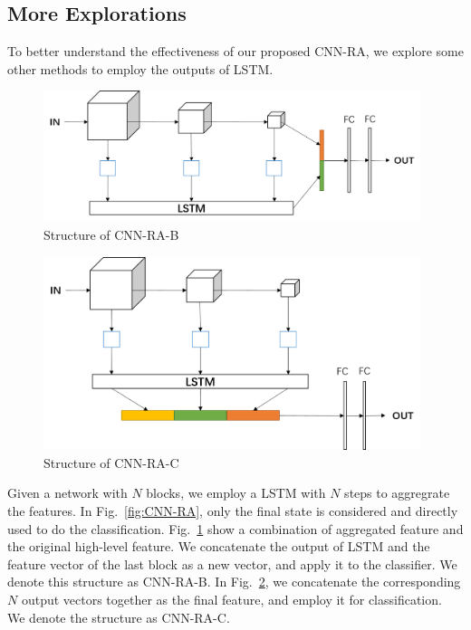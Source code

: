 \documentclass[runningheads]{llncs}
\begin{document}
\subsection{More Explorations}
To better understand the effectiveness of our proposed CNN-RA, we explore some other methods to employ the outputs of LSTM.
\begin{figure}   
	\centering
	\includegraphics[width=11cm]{Figures/RA-B.png}
	\caption{Structure of CNN-RA-B}
	\label{fig:CNN-RA-B}
\end{figure}
\begin{figure}  
	\centering
	\includegraphics[width=11cm]{Figures/RA-C.png}
	\caption{Structure of CNN-RA-C}
	\label{fig:CNN-RA-C}
\end{figure}

Given a network with $N$ blocks, we employ a LSTM with $N$ steps to aggregrate the features. In Fig.~\ref{fig:CNN-RA}, only the final state is considered and directly used to do the classification. Fig.~\ref{fig:CNN-RA-B} show a combination of aggregated feature and the original high-level feature. We concatenate the output of LSTM and the feature vector of the last block as a new vector, and apply it to the classifier. We denote this structure as CNN-RA-B. In Fig.~\ref{fig:CNN-RA-C}, we concatenate the corresponding $N$ output vectors together as the final feature, and employ it for classification. We denote the structure as CNN-RA-C.
\end{document}
